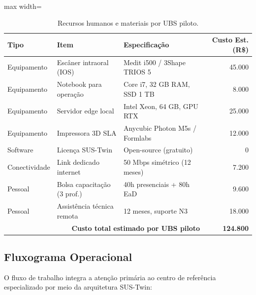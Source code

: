\begin{table}[htbp]
\centering
\caption{Recursos humanos e materiais por UBS piloto.}
\label{tab:recursos-piloto}
\begin{adjustbox}{max width=\textwidth}
\begin{tabular}{lp{5cm}p{5cm}r}
\toprule
\textbf{Tipo} & \textbf{Item} & \textbf{Especificação} & \textbf{Custo Est. (R\$)} \\
\midrule
Equipamento & Escâner intraoral (IOS) & Medit i500 / 3Shape TRIOS 5
& 45.000 \\
Equipamento & Notebook para operação & Core i7, 32 GB RAM, SSD 1 TB
& 8.000 \\
Equipamento & Servidor edge local & Intel Xeon, 64 GB, GPU RTX & 25.000 \\
Equipamento & Impressora 3D SLA & Anycubic Photon M5s / Formlabs &
12.000 \\
Software & Licença SUS-Twin & Open-source (gratuito) & 0 \\
Conectividade & Link dedicado internet & 50 Mbps simétrico (12 meses) &
7.200 \\
Pessoal & Bolsa capacitação (3 prof.) & 40h presenciais + 80h EaD &
9.600 \\
Pessoal & Assistência técnica remota & 12 meses, suporte N3 & 18.000 \\
\midrule
\multicolumn{3}{r}{\textbf{Custo total estimado por UBS piloto}} &
\textbf{124.800} \\
\bottomrule
\end{tabular}
\end{adjustbox}
\end{table}

\subsection{Fluxograma Operacional}

O fluxo de trabalho integra a atenção primária ao centro de referência
especializado por meio da arquitetura SUS-Twin:

